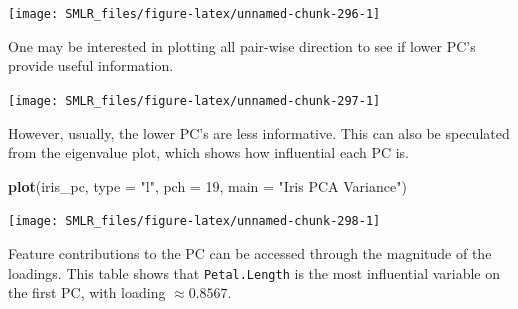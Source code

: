 \documentclass[
]{book}
\newenvironment{Shaded}{\begin{snugshade}}{\end{snugshade}}
\newcommand{\AttributeTok}[1]{\textcolor[rgb]{0.13,0.29,0.53}{#1}}
\newcommand{\DecValTok}[1]{\textcolor[rgb]{0.00,0.00,0.81}{#1}}
\newcommand{\DocumentationTok}[1]{\textcolor[rgb]{0.56,0.35,0.01}{\textbf{\textit{#1}}}}
\newcommand{\FunctionTok}[1]{\textcolor[rgb]{0.13,0.29,0.53}{\textbf{#1}}}
\newcommand{\NormalTok}[1]{#1}
\newcommand{\SpecialCharTok}[1]{\textcolor[rgb]{0.81,0.36,0.00}{\textbf{#1}}}
\newcommand{\StringTok}[1]{\textcolor[rgb]{0.31,0.60,0.02}{#1}}
\theoremstyle{definition}
\theoremstyle{definition}
\theoremstyle{definition}
\theoremstyle{definition}
\theoremstyle{remark}
\begin{document}
\begin{center}\texttt{[image: SMLR\_files/figure-latex/unnamed-chunk-296-1]} \end{center}

One may be interested in plotting all pair-wise direction to see if lower PC's provide useful information.

\begin{Shaded}
\end{Shaded}

\begin{center}\texttt{[image: SMLR\_files/figure-latex/unnamed-chunk-297-1]} \end{center}

However, usually, the lower PC's are less informative. This can also be speculated from the eigenvalue plot, which shows how influential each PC is.

\begin{Shaded}
\begin{Highlighting}[]
    \FunctionTok{plot}\NormalTok{(iris\_pc, }\AttributeTok{type =} \StringTok{"l"}\NormalTok{, }\AttributeTok{pch =} \DecValTok{19}\NormalTok{, }\AttributeTok{main =} \StringTok{"Iris PCA Variance"}\NormalTok{)}
\end{Highlighting}
\end{Shaded}

\begin{center}\texttt{[image: SMLR\_files/figure-latex/unnamed-chunk-298-1]} \end{center}

Feature contributions to the PC can be accessed through the magnitude of the loadings. This table shows that \texttt{Petal.Length} is the most influential variable on the first PC, with loading \(\approx 0.8567\).

\begin{Shaded}
\end{Shaded}
\end{document}
